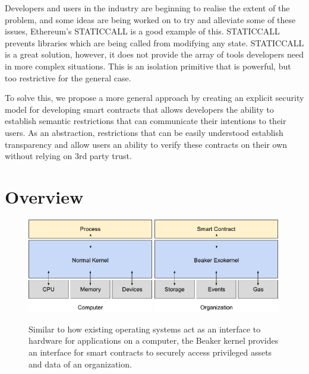 \documentclass[english,a4paper]{article}
\begin{document}
Developers and users in the industry are beginning to realise the extent of the
problem, and some ideas are being worked on to try and alleviate some of these
issues, Ethereum's STATICCALL is a good example of this. STATICCALL prevents
libraries which are being called from modifying any state. STATICCALL is a great
solution, however, it does not provide the array of tools developers need in
more complex situations. This is an isolation primitive that is powerful, but
too restrictive for the general case.

To solve this, we propose a more general approach by creating an
explicit security model for developing smart contracts that allows
developers the ability to establish semantic restrictions that can
communicate their intentions to their users. As an abstraction,
restrictions that can be easily understood establish transparency and
allow users an ability to verify these contracts on their own without
relying on 3rd party trust.

\section{Overview}\label{overview}
\begin{figure}[H]
    \includegraphics[width=0.49\textwidth]{media/NormalKernelOverview.pdf}
    \includegraphics[width=0.49\textwidth]{media/BeakerKernelOverview.pdf}

    \caption{Similar to how existing operating systems act as an
    interface to hardware for applications on a computer, the Beaker kernel
    provides an interface for smart contracts to securely access privileged
    assets and data of an organization.\label{fig:kernels}}
\end{figure}
\end{document}
